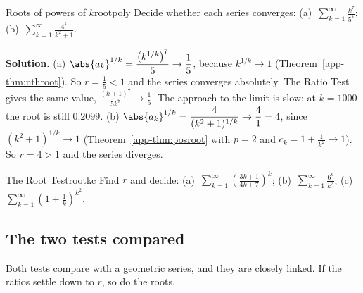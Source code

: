 \documentclass[11pt]{article}
\begin{document}
\begin{exmp}{Roots of powers of $k$}{rootpoly}
Decide whether each series converges: (a)~$\displaystyle\sum_{k=1}^\infty\frac{k^7}{5^k}$; \quad (b)~$\displaystyle\sum_{k=1}^\infty\frac{4^k}{k^2+1}$.

\textbf{Solution.} (a) $\abs{a_k}^{1/k}=\dfrac{\left(k^{1/k}\right)^7}5\to\dfrac15$, because $k^{1/k}\to1$ (Theorem~\ref{app-thm:nthroot}). So $r=\frac15<1$ and the series converges absolutely. The Ratio Test gives the same value, $\frac{(k+1)^7}{5k^7}\to\frac15$. The approach to the limit is slow: at $k=1000$ the root is still $0.2099$.
(b) $\abs{a_k}^{1/k}=\dfrac4{(k^2+1)^{1/k}}\to\dfrac41=4$, since $(k^2+1)^{1/k}\to1$ (Theorem~\ref{app-thm:posroot} with $p=2$ and $c_k=1+\frac1{k^2}\to1$). So $r=4>1$ and the series diverges.
\end{exmp}

\begin{kc}{The Root Test}{rootkc}
Find $r$ and decide: (a)~$\displaystyle\sum_{k=1}^\infty\left(\frac{3k+1}{4k+7}\right)^k$; \quad (b)~$\displaystyle\sum_{k=1}^\infty\frac{6^k}{k^3}$; \quad (c)~$\displaystyle\sum_{k=1}^\infty\left(1+\frac1k\right)^{k^2}$.
\end{kc}

\subsection*{The two tests compared}

Both tests compare with a geometric series, and they are closely linked. If the ratios settle down to $r$, so do the roots.
\end{document}

